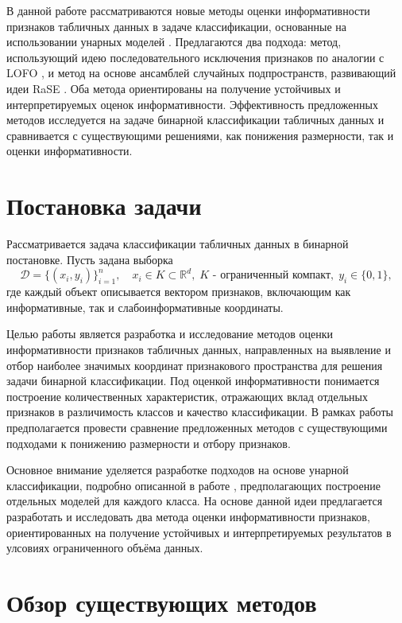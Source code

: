 \documentclass[12pt,a4paper]{article}
\begin{document}
В данной работе рассматриваются новые методы оценки информативности признаков табличных данных в 
задаче классификации, основанные на использовании унарных моделей \cite{unar}. Предлагаются два подхода: 
метод, использующий идею последовательного исключения признаков по аналогии с LOFO \cite{liu2013lofo}, и метод на 
основе ансамблей случайных подпространств, развивающий идеи RaSE \cite{tian2021rase}. Оба метода ориентированы на 
получение устойчивых и интерпретируемых оценок информативности. Эффективность предложенных 
методов исследуется на задаче бинарной классификации табличных данных и сравнивается с 
существующими решениями, как понижения размерности, так и оценки информативности.

\section{Постановка задачи}

Рассматривается задача классификации табличных данных в бинарной постановке. 
Пусть задана выборка
\begin{equation}
\mathcal{D} = \{(x_i, y_i)\}_{i=1}^n,\quad x_i \in K \subset \mathbb{R}^d,\; K \text{ - ограниченный компакт},\; y_i \in \{0,1\},
\end{equation}
где каждый объект описывается вектором признаков, включающим как информативные, 
так и слабоинформативные координаты.

Целью работы является разработка и исследование методов оценки информативности признаков 
табличных данных, направленных на выявление и отбор наиболее значимых координат признакового 
пространства для решения задачи бинарной классификации. Под оценкой информативности понимается 
построение количественных характеристик, отражающих вклад отдельных признаков в различимость 
классов и качество классификации. В рамках работы предполагается провести сравнение предложенных 
методов с существующими подходами к понижению размерности и отбору признаков.

Основное внимание уделяется разработке подходов на основе унарной классификации, подробно описанной в работе \cite{unar}, предполагающих 
построение отдельных моделей для каждого класса. На основе данной идеи предлагается разработать 
и исследовать два метода оценки информативности признаков, ориентированных на получение 
устойчивых и интерпретируемых результатов в улсовиях ограниченного объёма данных.

\section{Обзор существующих методов}
\end{document}
